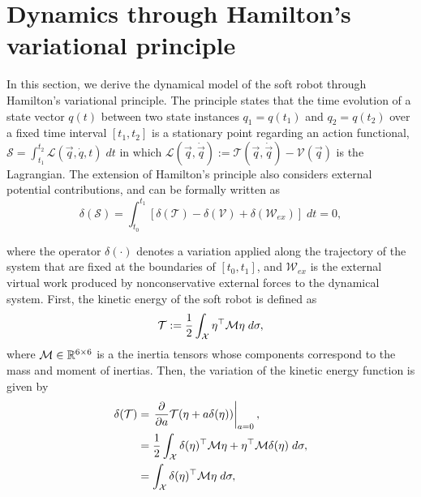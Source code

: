 \newpage
\section{Dynamics through Hamilton's variational principle}
In this section, we derive the dynamical model of the soft robot through Hamilton's variational principle. The principle states that the time evolution of a state vector $q(t)$ between two state instances $q_1 = q(t_1)$ and $q_2 = q(t_2)$ over a fixed time interval $[t_1,t_2]$ is a stationary point regarding an action functional, $\mathcal{S} = \int_{t_1}^{t_2} \mathcal{L}(\vec{q},\dot{q},t) \; dt$ in which $\mathcal{L}(\vec{q},\dot{\vec{q}}) := \mathcal{T}(\vec{q},\dot{\vec{q}}) - \mathcal{V}(\vec{q})$ is the Lagrangian. The extension of Hamilton's principle \cite{Boyer2010} also considers external potential contributions, and can be formally written as
\begin{equation}
\delta(\mathcal{S}) = \int_{t_0}^{t_1} \left[\delta(\mathcal{T}) - \delta(\mathcal{V}) + \delta(\mathcal{W}_{ex}) \right]\; dt = 0,
\end{equation}

\noindent where the operator $\delta(\cdot)$ denotes a variation applied along the trajectory of the system that are fixed at the boundaries of $[t_0,t_1]$, and $\mathcal{W}_{ex}$ is the external virtual work produced by nonconservative external forces to the dynamical system. First, the kinetic energy of the soft robot is defined as 
\begin{equation}
\mathcal{T} := \frac{1}{2}\int_{\mathcal{X}} {\eta}^\top \mathcal{M} {\eta}\;d\sigma, \label{eq:c2_Tfunc} 
\end{equation}
\noindent where $\mathcal{M} \in \mathbb{R}^{6\times6}$ is a the inertia tensors whose components correspond to the mass and moment of inertias. Then, the variation of the kinetic energy function is given by
\begin{align}
\delta(\mathcal{T}) & = \left. \frac{\partial }{\partial a} \mathcal{T}({\eta} + a \delta({\eta})) \right|_{a = 0}, \notag \\
& = \frac{1}{2} \int_{\mathcal{X}} \delta({\eta})^\top \mathcal{M} {\eta} + {\eta}^\top \mathcal{M} \delta({\eta}) \; d\sigma, \notag \\
& = \int_{\mathcal{X}} \delta({\eta})^\top \mathcal{M} {\eta} \; d\sigma, \label{eq:c2_varham_T}
\end{align}


